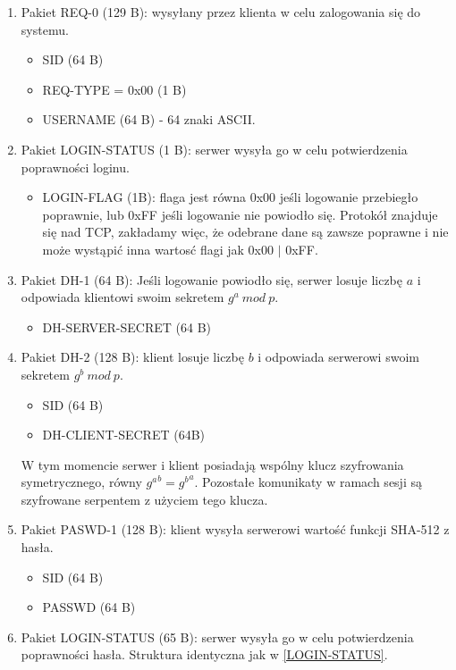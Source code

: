 \documentclass{article}
\begin{document}
	\begin{enumerate}
		\item Pakiet REQ-0 \label{REQ-1} (129 B): wysyłany przez klienta w celu zalogowania się do systemu. 
		\begin{itemize}
			\item SID (64 B)
			\item REQ-TYPE = 0x00 (1 B)
			\item USERNAME (64 B) - 64 znaki ASCII. 
		\end{itemize}
	
		\item Pakiet LOGIN-STATUS \label{LOGIN-STATUS} (1 B): serwer wysyła go w celu potwierdzenia poprawności loginu. 
		\begin{itemize}
			\item LOGIN-FLAG (1B): flaga jest równa 0x00 jeśli logowanie przebiegło poprawnie, lub 0xFF jeśli logowanie nie powiodło się. Protokół znajduje się nad TCP, zakładamy więc, że odebrane dane są zawsze poprawne i nie może wystąpić inna wartosć flagi jak 0x00 $|$ 0xFF. 
		\end{itemize}
	
		\item Pakiet DH-1 \label{DH-1} (64 B): Jeśli logowanie powiodło się, serwer losuje liczbę $a$ i odpowiada klientowi swoim sekretem $g^a\ mod\ p$. 
		\begin{itemize}
			\item DH-SERVER-SECRET (64 B)
		\end{itemize}
	
		\item Pakiet DH-2 \label{DH-2} (128 B): klient losuje liczbę $b$ i odpowiada serwerowi swoim sekretem $g^b\ mod\ p$. 
		\begin{itemize}
			\item SID (64 B)
			\item DH-CLIENT-SECRET (64B)
		\end{itemize}
		W tym momencie serwer i klient posiadają wspólny klucz szyfrowania symetrycznego, równy ${g^a}^b={g^b}^a$. Pozostałe komunikaty w ramach sesji są szyfrowane serpentem z użyciem tego klucza. 
		
		\item Pakiet PASWD-1 \label{PASWD-1} (128 B): klient wysyła serwerowi wartość funkcji SHA-512 z hasła. 
		\begin{itemize}
			\item SID (64 B)
			\item PASSWD (64 B)
		\end{itemize}
	
		\item Pakiet LOGIN-STATUS (65 B): serwer wysyła go w celu potwierdzenia poprawności hasła. Struktura identyczna jak w \ref{LOGIN-STATUS}. 	
		
	\end{enumerate}
\end{document}
